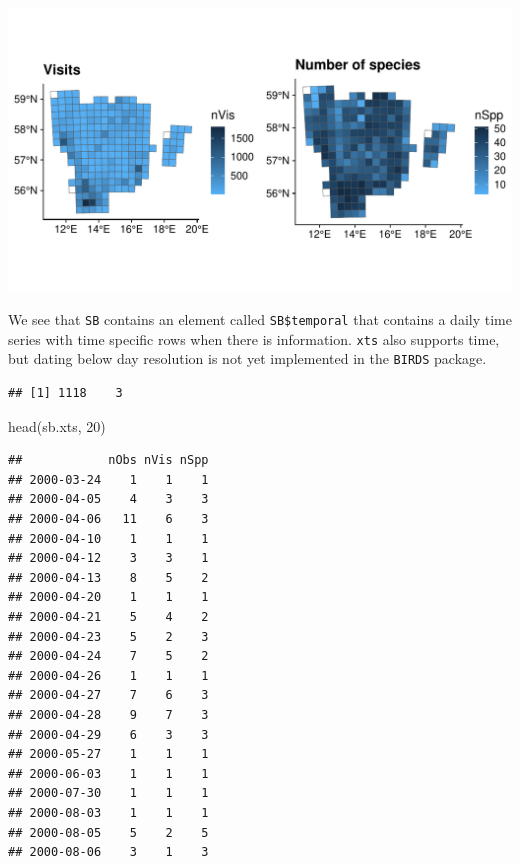 \documentclass[
  10pt,
]{article}
\newenvironment{Shaded}{\begin{snugshade}}{\end{snugshade}}
\newcommand{\DecValTok}[1]{\textcolor[rgb]{0.00,0.00,0.81}{#1}}
\newcommand{\FunctionTok}[1]{\textcolor[rgb]{0.00,0.00,0.00}{#1}}
\newcommand{\NormalTok}[1]{#1}
\newcommand{\OtherTok}[1]{\textcolor[rgb]{0.56,0.35,0.01}{#1}}
\newcommand{\SpecialCharTok}[1]{\textcolor[rgb]{0.00,0.00,0.00}{#1}}
\begin{document}
\includegraphics{r-tools-tutorial_files/figure-latex/ggplot1-1.pdf}

We see that \texttt{SB} contains an element called \texttt{SB\$temporal} that contains a daily
time series with time specific rows when there is information. \texttt{xts} also supports
time, but dating below day resolution is not yet implemented in the \texttt{BIRDS} package.

\begin{Shaded}
\end{Shaded}

\begin{verbatim}
## [1] 1118    3
\end{verbatim}

\begin{Shaded}
\begin{Highlighting}[]
\FunctionTok{head}\NormalTok{(sb.xts, }\DecValTok{20}\NormalTok{)}
\end{Highlighting}
\end{Shaded}

\begin{verbatim}
##            nObs nVis nSpp
## 2000-03-24    1    1    1
## 2000-04-05    4    3    3
## 2000-04-06   11    6    3
## 2000-04-10    1    1    1
## 2000-04-12    3    3    1
## 2000-04-13    8    5    2
## 2000-04-20    1    1    1
## 2000-04-21    5    4    2
## 2000-04-23    5    2    3
## 2000-04-24    7    5    2
## 2000-04-26    1    1    1
## 2000-04-27    7    6    3
## 2000-04-28    9    7    3
## 2000-04-29    6    3    3
## 2000-05-27    1    1    1
## 2000-06-03    1    1    1
## 2000-07-30    1    1    1
## 2000-08-03    1    1    1
## 2000-08-05    5    2    5
## 2000-08-06    3    1    3
\end{verbatim}
\end{document}

